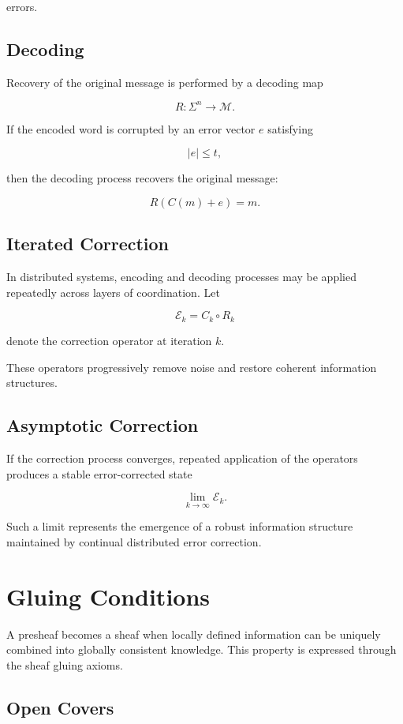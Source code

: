 \documentclass[12pt]{article}
\begin{document}
errors.

\subsection{Decoding}

Recovery of the original message is performed by a decoding map

\[
R : \Sigma^n \rightarrow \mathcal{M}.
\]

If the encoded word is corrupted by an error vector $e$ satisfying

\[
|e| \le t,
\]

then the decoding process recovers the original message:

\[
R(C(m)+e) = m.
\]

\subsection{Iterated Correction}

In distributed systems, encoding and decoding processes may be applied repeatedly across layers of coordination. Let

\[
\mathcal{E}_k = C_k \circ R_k
\]

denote the correction operator at iteration $k$.

These operators progressively remove noise and restore coherent information structures.

\subsection{Asymptotic Correction}

If the correction process converges, repeated application of the operators produces a stable error-corrected state

\[
\lim_{k \to \infty} \mathcal{E}_k.
\]

Such a limit represents the emergence of a robust information structure maintained by continual distributed error correction.

\section{Gluing Conditions}

A presheaf becomes a sheaf when locally defined information can be uniquely combined into globally consistent knowledge. This property is expressed through the sheaf gluing axioms.

\subsection{Open Covers}
\end{document}
